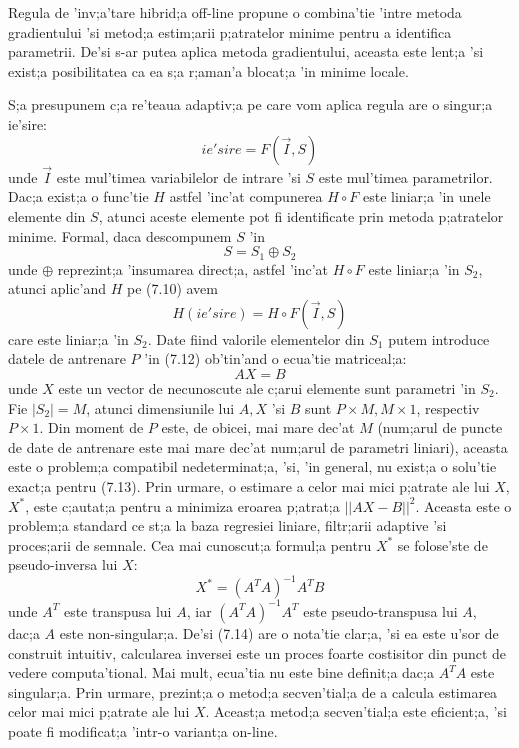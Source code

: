 Regula de 'inv;a'tare hibrid;a off-line propune o combina'tie 'intre metoda gradientului 'si metod;a estim;arii p;atratelor minime pentru a identifica parametrii. De'si s-ar putea aplica metoda gradientului, aceasta este lent;a 'si exist;a posibilitatea ca ea s;a r;aman'a blocat;a 'in minime locale.
\par
S;a presupunem c;a re'teaua adaptiv;a pe care vom aplica regula are o singur;a ie'sire:
\begin{equation}
ie'sire = F(\overrightarrow{I}, S)
\end{equation}
unde $\overrightarrow{I}$ este mul'timea variabilelor de intrare 'si $S$ este mul'timea parametrilor. Dac;a exist;a o func'tie $H$ astfel 'inc'at compunerea $H \circ F$ este liniar;a 'in unele elemente din $S$, atunci aceste elemente pot fi identificate prin metoda p;atratelor minime. Formal, daca descompunem $S$ 'in
\begin{equation}
S = S_{1} \oplus S_{2}
\end{equation}
unde $\oplus$ reprezint;a 'insumarea direct;a, astfel 'inc'at $H \circ F$ este liniar;a 'in $S_{2}$, atunci aplic'and $H$ pe (7.10) avem
\begin{equation}
H(ie'sire) = H \circ F(\overrightarrow{I}, S)
\end{equation}
care este liniar;a 'in $S_{2}$. Date fiind valorile elementelor din $S_{1}$ putem introduce datele de antrenare $P$ 'in (7.12) ob'tin'and o ecua'tie matriceal;a:
\begin{equation}
AX = B
\end{equation}
unde $X$ este un vector de necunoscute ale c;arui elemente sunt parametri 'in $S_{2}$. Fie $|S_{2}| = M$, atunci dimensiunile lui $A, X$ 'si $B$ sunt $P \times M, M \times 1$, respectiv $P \times 1$. Din moment de $P$ este, de obicei, mai mare dec'at $M$ (num;arul de puncte de date de antrenare este mai mare dec'at num;arul de parametri liniari), aceasta este o problem;a compatibil nedeterminat;a, 'si, 'in general, nu exist;a o solu'tie exact;a pentru (7.13). Prin urmare, o estimare a celor mai mici p;atrate ale lui $X$, $X^{*}$, este c;autat;a pentru a minimiza eroarea p;atrat;a $||AX - B||^{2}$. Aceasta este o problem;a standard ce st;a la baza regresiei liniare, filtr;arii adaptive 'si proces;arii de semnale. Cea mai cunoscut;a formul;a pentru $X^{*}$ se folose'ste de pseudo-inversa lui $X$:
\begin{equation}
X^{*} = (A^{T}A)^{-1}A^{T}B
\end{equation}
unde $A^{T}$ este transpusa lui $A$, iar $(A^{T}A)^{-1}A^{T}$ este pseudo-transpusa lui $A$, dac;a $A$ este non-singular;a. De'si (7.14) are o nota'tie clar;a, 'si ea este u'sor de construit intuitiv, calcularea inversei este un proces foarte costisitor din punct de vedere computa'tional. Mai mult, ecua'tia nu este bine definit;a dac;a $A^{T}A$ este singular;a. Prin urmare, \cite{anfis} prezint;a o metod;a secven'tial;a de a calcula estimarea celor mai mici p;atrate ale lui $X$. Aceast;a metod;a secven'tial;a este eficient;a, 'si poate fi modificat;a 'intr-o variant;a on-line.
